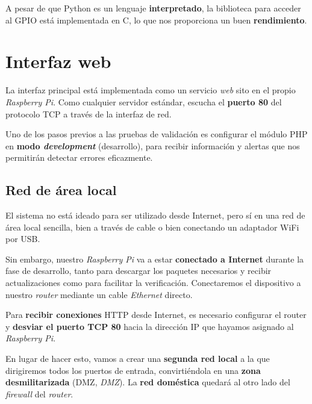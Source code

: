 A pesar de que Python es un lenguaje \textbf{interpretado}, la biblioteca para acceder al \acrshort{GPIO} está implementada en C, lo que nos proporciona un buen \textbf{rendimiento}.

\newpage

\section{Interfaz web}

La interfaz principal está implementada como un servicio \textit{web} sito en el propio \textit{Raspberry Pi}. Como cualquier servidor estándar, escucha el \textbf{puerto 80} del protocolo \acrshort{TCP} a través de la interfaz de red.

Uno de los pasos previos a las pruebas de validación es configurar el módulo \acrshort{PHP} en \textbf{modo \textit{development}} (desarrollo), para recibir información y alertas que nos permitirán detectar errores eficazmente.

\subsection{Red de área local}

El sistema no está ideado para ser utilizado desde Internet, pero sí en una red de área local sencilla, bien a través de cable o bien conectando un adaptador WiFi por \acrshort{USB}.

Sin embargo, nuestro \textit{Raspberry Pi} va a estar \textbf{conectado a Internet} durante la fase de desarrollo, tanto para descargar los paquetes necesarios y recibir actualizaciones como para facilitar la verificación. Conectaremos el dispositivo a nuestro \textit{router} mediante un cable \textit{Ethernet} directo.

Para \textbf{recibir conexiones} \acrshort{HTTP} desde Internet, es necesario configurar el router y \textbf{desviar el puerto \acrshort{TCP} 80} hacia la dirección \acrshort{IP} que hayamos asignado al \textit{Raspberry Pi}. 

En lugar de hacer esto, vamos a crear una \textbf{segunda red local} a la que dirigiremos todos los puertos de entrada, convirtiéndola en una \textbf{zona desmilitarizada} (\acrshort{DMZ}, \textit{\acrlong{DMZ}}). La \textbf{red doméstica} quedará al otro lado del \textit{firewall} del \textit{router}.

\smallskip

